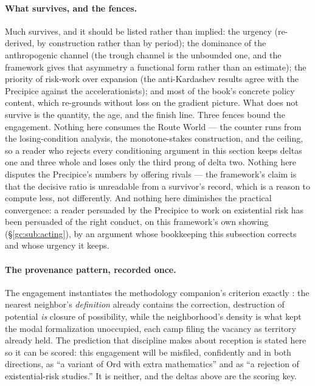 \documentclass[11pt]{article}
\numberwithin{equation}{section}
\theoremstyle{plain}
\theoremstyle{definition}
\theoremstyle{remark}
\begin{document}
\paragraph{What survives, and the fences.} Much survives, and it
should be listed rather than implied: the urgency (re-derived, by
construction rather than by period); the dominance of the
anthropogenic channel (the trough channel is the unbounded one, and
the framework gives that asymmetry a functional form rather than an
estimate); the priority of risk-work over expansion (the
anti-Kardashev results agree with the Precipice against the
accelerationists); and most of the book's concrete policy content,
which re-grounds without loss on the gradient picture. What does not
survive is the quantity, the age, and the finish line. Three fences
bound the engagement. Nothing here consumes the Route World --- the
counter runs from the losing-condition analysis, the monotone-stakes
construction, and the ceiling, so a reader who rejects every
conditioning argument in this section keeps deltas one and three
whole and loses only the third prong of delta two. Nothing here
disputes the Precipice's numbers by offering rivals --- the
framework's claim is that the decisive ratio is unreadable from a
survivor's record, which is a reason to compute less, not
differently. And nothing here diminishes the practical convergence:
a reader persuaded by the Precipice to work on existential risk has
been persuaded of the right conduct, on this framework's own showing
(\S\ref{gc:sub:acting}), by an argument whose bookkeeping this
subsection corrects and whose urgency it keeps.

\paragraph{The provenance pattern, recorded once.} The engagement
instantiates the methodology companion's criterion exactly
\cite{Ben26Method}: the nearest neighbor's \emph{definition} already
contains the correction, destruction of potential \emph{is}
closure of possibility, while the neighborhood's density is what
kept the modal formalization unoccupied, each camp filing the vacancy
as territory already held. The prediction that discipline makes about
reception is stated here so it can be scored: this engagement will be
misfiled, confidently and in both directions, as ``a variant of Ord
with extra mathematics'' and as ``a rejection of existential-risk
studies.'' It is neither, and the deltas above are the scoring key.
\end{document}

